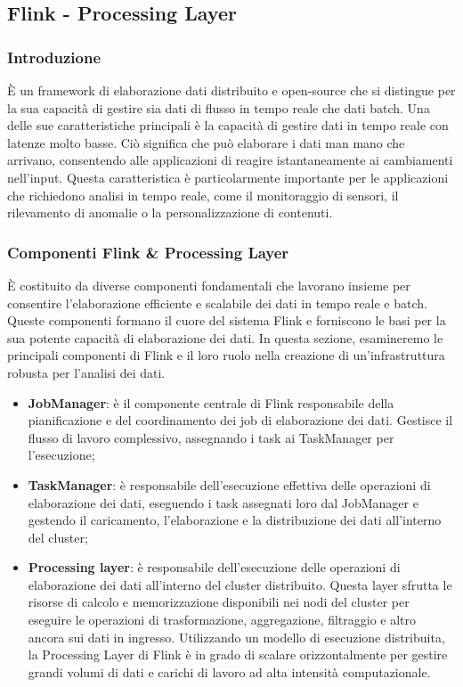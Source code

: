 \subsection{Flink - Processing Layer}
\subsubsection{Introduzione}
È un framework di elaborazione dati distribuito e open-source che si distingue per la sua capacità di gestire sia dati di flusso in tempo reale che dati batch. Una delle sue caratteristiche principali è la capacità di gestire dati in tempo reale con latenze molto basse. Ciò significa che può elaborare i dati man mano che arrivano, consentendo alle applicazioni di reagire istantaneamente ai cambiamenti nell'input. Questa caratteristica è particolarmente importante per le applicazioni che richiedono analisi in tempo reale, come il monitoraggio di sensori, il rilevamento di anomalie o la personalizzazione di contenuti.
\subsubsection{Componenti Flink \& Processing Layer}
È costituito da diverse componenti fondamentali che lavorano insieme per consentire l'elaborazione efficiente e scalabile dei dati in tempo reale e batch. Queste componenti formano il cuore del sistema Flink e forniscono le basi per la sua potente capacità di elaborazione dei dati. In questa sezione, esamineremo le principali componenti di Flink e il loro ruolo nella creazione di un'infrastruttura robusta per l'analisi dei dati.
\begin{itemize}
	\item \textbf{JobManager}: è il componente centrale di Flink responsabile della pianificazione e del coordinamento dei job di elaborazione dei dati. Gestisce il flusso di lavoro complessivo, assegnando i task ai TaskManager per l'esecuzione;
	\item \textbf{TaskManager}: è responsabile dell'esecuzione effettiva delle operazioni di elaborazione dei dati, eseguendo i task assegnati loro dal JobManager e gestendo il caricamento, l'elaborazione e la distribuzione dei dati all'interno del cluster;
	\item \textbf{Processing layer}: è responsabile dell'esecuzione delle operazioni di elaborazione dei dati all'interno del cluster distribuito. Questa layer sfrutta le risorse di calcolo e memorizzazione disponibili nei nodi del cluster per eseguire le operazioni di trasformazione, aggregazione, filtraggio e altro ancora sui dati in ingresso. Utilizzando un modello di esecuzione distribuita, la Processing Layer di Flink è in grado di scalare orizzontalmente per gestire grandi volumi di dati e carichi di lavoro ad alta intensità computazionale.
\end{itemize}
